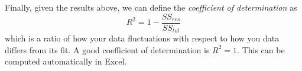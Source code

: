 \documentclass[12pt]{report}
\begin{document}
\begin{appendix}
Finally, given the results above, we can define the \textit{coefficient of determination} as
\begin{equation}
R^2 = 1 - \frac{SS_{res}}{SS_{tot}}
\end{equation}
which is a ratio of how your data fluctuations with respect to how you data differs from its fit. A good coefficient of determination is $R^2=1$. This can be computed automatically in Excel.


\end{appendix}

%
%
\end{document}
